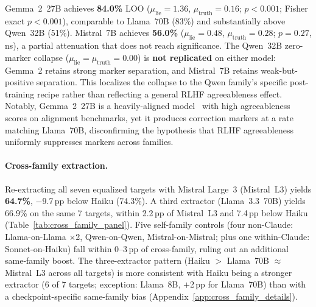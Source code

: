 Gemma~2~27B achieves \textbf{84.0\%} LOO ($\mu_\mathrm{lie}\!=\!1.36$, $\mu_\mathrm{truth}\!=\!0.16$; $p\!<\!0.001$; Fisher exact $p\!<\!0.001$), comparable to Llama~70B (83\%) and substantially above Qwen~32B (51\%). Mistral~7B achieves \textbf{56.0\%} ($\mu_\mathrm{lie}\!=\!0.48$, $\mu_\mathrm{truth}\!=\!0.28$; $p\!=\!0.27$, ns), a partial attenuation that does not reach significance. The Qwen~32B zero-marker collapse ($\mu_\mathrm{lie}\!=\!\mu_\mathrm{truth}\!=\!0.00$) is \textbf{not replicated} on either model: Gemma~2 retains strong marker separation, and Mistral~7B retains weak-but-positive separation. This localizes the collapse to the Qwen family's specific post-training recipe rather than reflecting a general RLHF agreeableness effect. Notably, Gemma~2~27B is a heavily-aligned model~\cite{team2024gemma2} with high agreeableness scores on alignment benchmarks, yet it produces correction markers at a rate matching Llama~70B, disconfirming the hypothesis that RLHF agreeableness uniformly suppresses markers across families.

\paragraph{Cross-family extraction.}
\label{sec:cross_family_equalized}
Re-extracting all seven equalized targets with Mistral Large~3 (Mistral~L3) yields \textbf{64.7\%}, $-$9.7\,pp below Haiku (74.3\%). A third extractor (Llama~3.3~70B) yields 66.9\% on the same 7 targets, within 2.2\,pp of Mistral~L3 and 7.4\,pp below Haiku (Table~\ref{tab:cross_family_panel}). Five self-family controls (four non-Claude: Llama-on-Llama $\times$2, Qwen-on-Qwen, Mistral-on-Mistral; plus one within-Claude: Sonnet-on-Haiku) fall within 0--3\,pp of cross-family, ruling out an additional same-family boost. The three-extractor pattern (Haiku $>$ Llama~70B $\approx$ Mistral~L3 across all targets) is more consistent with Haiku being a stronger extractor (6 of 7 targets; exception: Llama~8B, $+$2\,pp for Llama~70B) than with a checkpoint-specific same-family bias (Appendix~\ref{app:cross_family_details}).

